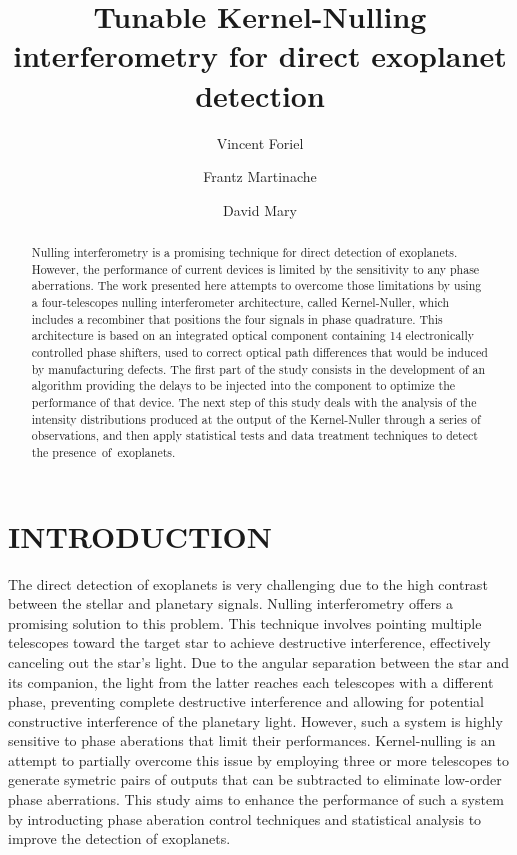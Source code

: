 \documentclass[]{spie}  %
\title{Tunable Kernel-Nulling interferometry for direct exoplanet detection}
\author[a,*]{Vincent Foriel}
\author[a]{Frantz Martinache}
\author[a]{David Mary}
\affil[a]{Université Côte d’Azur, Observatoire de la Côte d’Azur Nice, CNRS, Laboratoire Lagrange, Nice, France}
\begin{document}
\maketitle

\begin{abstract}

    Nulling interferometry\cite{Bracewell} is a promising technique for direct detection of exoplanets. However, the performance of current devices is limited by the sensitivity to any phase aberrations. The work presented here attempts to overcome those limitations by using a four-telescopes nulling interferometer architecture, called Kernel-Nuller\cite{Martinache et al. 2018}, which includes a recombiner that positions the four signals in phase quadrature. This architecture is based on an integrated optical component containing 14 electronically controlled phase shifters, used to correct optical path differences that would be induced by manufacturing defects. The first part of the study consists in the development of an algorithm providing the delays to be injected into the component to optimize the performance of that device. The next step of this study deals with the analysis of the intensity distributions produced at the output of the Kernel-Nuller\cite{Martinache et al. 2018, Cvetojevic et al. 2022} through a series of observations, and then apply statistical tests and data treatment techniques to detect the presence of exoplanets.

\end{abstract}


\section{INTRODUCTION}
\label{sec:intro} %

The direct detection of exoplanets is very challenging due to the high contrast between the stellar and planetary signals. Nulling interferometry offers a promising solution to this problem. This technique involves pointing multiple telescopes toward the target star to achieve destructive interference, effectively canceling out the star's light. Due to the angular separation between the star and its companion, the light from the latter reaches each telescopes with a different phase, preventing complete destructive interference and allowing for potential constructive interference of the planetary light. However, such a system is highly sensitive to phase aberations that limit their performances. Kernel-nulling is an attempt to partially overcome this issue by employing three or more\cite{N telescope kernel} telescopes to generate symetric pairs of outputs that can be subtracted to eliminate low-order phase aberrations\cite{Martinache et al. 2018}. This study aims to enhance the performance of such a system by introducting phase aberation control techniques and statistical analysis to improve the detection of exoplanets.
\end{document}
